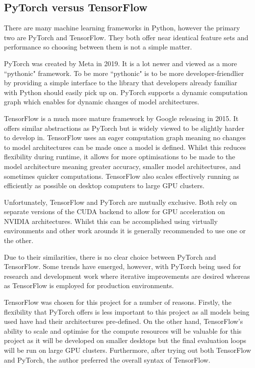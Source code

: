 \subsection{PyTorch versus TensorFlow}

There are many machine learning frameworks in Python, however the primary two are PyTorch\cite{paszke2019pytorch} and TensorFlow\cite{abadi2016tensorflow}. They both offer near identical feature sets and performance so choosing between them is not a simple matter.

PyTorch was created by Meta in 2019. It is a lot newer and viewed as a more ``pythonic" framework\cite{chirodea2021comparison}. To be more ``pythonic" is to be more developer-friendlier by providing a simple interface to the library that developers already familiar with Python should easily pick up on. PyTorch supports a dynamic computation graph which enables for dynamic changes of model architectures.

TensorFlow is a much more mature framework by Google releasing in 2015. It offers similar abstractions as PyTorch but is widely viewed to be slightly harder to develop in\cite{chirodea2021comparison}. TensorFlow uses an eager computation graph meaning no changes to model architectures can be made once a model is defined. Whilst this reduces flexibility during runtime, it allows for more optimisations to be made to the model architecture meaning greater accuracy, smaller model architectures, and sometimes quicker computations. TensorFlow also scales effectively running as efficiently as possible on desktop computers to large GPU clusters.

Unfortunately, TensorFlow and PyTorch are mutually exclusive. Both rely on separate versions of the CUDA backend to allow for GPU acceleration on NVIDIA architectures. Whilst this can be accomplished using virtually environments and other work arounds it is generally recommended to use one or the other.

Due to their similarities, there is no clear choice between PyTorch and TensorFlow. Some trends have emerged, however, with PyTorch being used for research and development work where iterative improvements are desired whereas as TensorFlow is employed for production environments. 

TensorFlow was chosen for this project for a number of reasons. Firstly, the flexibility that PyTorch offers is less important to this project as all models being used have had their architectures pre-defined. On the other hand, TensorFlow's ability to scale and optimise for the compute resources will be valuable for this project as it will be developed on smaller desktops but the final evaluation loops will be run on large GPU clusters. Furthermore, after trying out both TensorFlow and PyTorch, the author preferred the overall syntax of TensorFlow.

